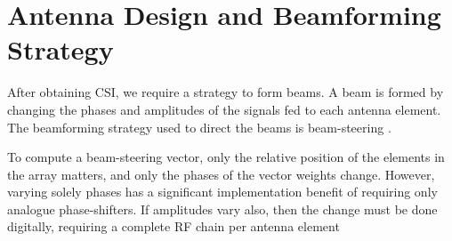 \section{Antenna Design and Beamforming Strategy}
\label{sec:antennas}








After obtaining CSI, we require a strategy to form beams. A beam is formed by changing the phases and amplitudes of the signals fed to each antenna element. The beamforming strategy used to direct the beams is beam-steering  . 

To compute a beam-steering vector, only the relative position of the elements in the array matters, and only the phases of the vector weights change. However, varying solely phases has a significant implementation benefit of requiring only analogue phase-shifters. If amplitudes vary also, then the change must be done digitally, requiring a complete RF chain per antenna element \cite{8744505}

\begin{comment} %
To only way of changing the amplitudes of the weights without requiring one RF chain per antenna element is to use windows (or tapers), which can reduce the \ac{SLL} at a cost of increasing the main beam width or at a cost of increasing the lobe-level past the secondary lobe. Such tapers attenuate by a constant and fixed amount the power transmitted by certain antenna elements. However, this matter will be left out of this thesis for conciseness, perhaps to be study in the future (Section \ref{sec:future-work}). Consequently, we form beams changing only phases across the beam-steering vector. Realistic antenna arrays with tenths, hundreds or even thousands of elements may use analogue phase-shifters to beamform at RF frequencies instead of doing it digitally at BB, for cost reasons.
\end{comment}

